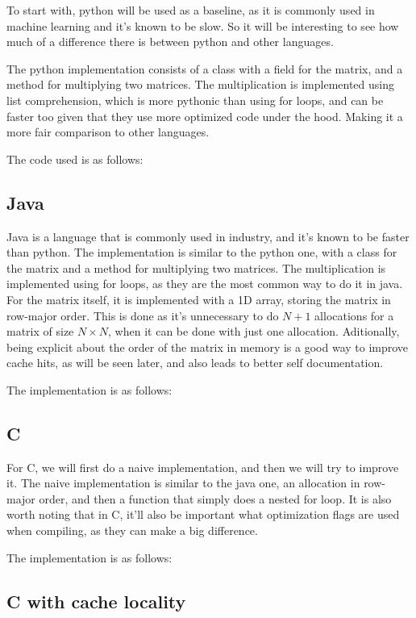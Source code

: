 \documentclass{article}
\begin{document}
To start with, python will be used as a baseline, as it is commonly used in machine learning and it's known to be slow.
So it will be interesting to see how much of a difference there is between python and other languages.

The python implementation consists of a class with a field for the matrix, and a method for multiplying two matrices.
The multiplication is implemented using list comprehension, which is more pythonic than using for loops, and can be faster too
given that they use more optimized code under the hood. Making it a more fair comparison to other languages.

The code used is as follows:

\subsection{Java}

Java is a language that is commonly used in industry, and it's known to be faster than python.
The implementation is similar to the python one, with a class for the matrix and a method for multiplying two matrices.
The multiplication is implemented using for loops, as they are the most common way to do it in java.
For the matrix itself, it is implemented with a 1D array, storing the matrix in row-major order.
This is done as it's unnecessary to do $N+1$ allocations for a matrix of size $N\times N$,
when it can be done with just one allocation. Aditionally, being explicit about the order of the matrix in memory
is a good way to improve cache hits, as will be seen later, and also leads to better self documentation.

The implementation is as follows:

\subsection{C}

For C, we will first do a naive implementation, and then we will try to improve it.
The naive implementation is similar to the java one, an allocation in row-major order, and then a function that simply does a nested for loop.
It is also worth noting that in C, it'll also be important what optimization flags are used when compiling, as they can make a big difference.

The implementation is as follows:

\newpage

\subsection{C with cache locality}
\end{document}
